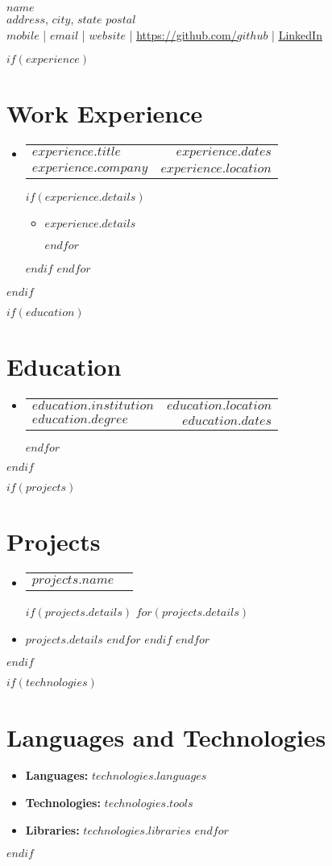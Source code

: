 \documentclass[letterpaper,10pt]{article}
\makeatletter
\newcommand{\resumeItem}[1]{
  \item\small{
    {#1 \vspace{-2pt}}
  }
}
\newcommand{\resumeSubheading}[4]{
  \vspace{-2pt}\item
    \begin{tabular*}{1.0\textwidth}[t]{l@{\extracolsep{\fill}}r}
      \textbf{#1} & \textbf{\small #2} \\
      \textit{\small#3} & \textit{\small #4} \\
    \end{tabular*}\vspace{-7pt}
}
\newcommand{\resumeProjectHeading}[1]{
    \item
    \begin{tabular*}{0.97\textwidth}{l@{\extracolsep{\fill}}r}
      \small#1  \\
    \end{tabular*}\vspace{-7pt}
}
\newcommand{\resumeSubHeadingListStart}{\begin{itemize}[leftmargin=0.0in, label={}]}
\newcommand{\resumeSubHeadingListEnd}{\end{itemize}}
\newcommand{\resumeItemListStart}{\begin{itemize}}
\newcommand{\resumeItemListEnd}{\end{itemize}\vspace{-5pt}}
\makeatother
\begin{document}
\begin{center}
    \textbf{\Huge \scshape $name$} \\ \vspace{1pt}
    $address$, $city$, $state$ $postal$ \\ \vspace{1pt}
    \small \raisebox{-0.1\height}$mobile$ | \href{mailto:$email$}{\underline{$email$}} |
    \href{https://$website$}{\underline{$website$}} |
    \href{https://github.com/$github$}{\underline{https://github.com/$github$}} |
    \href{https://linkedin.com/in/$linkedinID$}{\underline{LinkedIn}}
\end{center}

$if(experience)$
\section{Work Experience}
\resumeSubHeadingListStart
$for(experience)$
\resumeSubheading
  {$experience.title$}{$experience.dates$}
  {$experience.company$} {$experience.location$}
  $if(experience.details)$
  \resumeItemListStart 
    $for(experience.details)$
      \resumeItem{$experience.details$}
    $endfor$
  \resumeItemListEnd 
  $endif$
$endfor$
\resumeSubHeadingListEnd
$endif$

$if(education)$
\section{Education}
  \resumeSubHeadingListStart
  $for(education)$
    \resumeSubheading
    {$education.institution$}{$education.location$}
    {$education.degree$}{$education.dates$}
  $endfor$
  \resumeSubHeadingListEnd
$endif$

$if(projects)$
\section{Projects}
  \resumeSubHeadingListStart
  \vspace{-5pt}
  $for(projects)$
  \resumeProjectHeading
    {\textbf {$projects.name$}}
    $if(projects.details)$
    $for(projects.details)$
      \item\small{$projects.details$ \vspace{-2pt}}
    $endfor$
    $endif$
  $endfor$
  \vspace{-13pt}
  \resumeSubHeadingListEnd
$endif$


$if(technologies)$
\section{Languages and Technologies}
\resumeSubHeadingListStart
$for(technologies)$
\item\small{\textbf{Languages:} $technologies.languages$ \vspace{-2pt}}
\item\small{\textbf{Technologies:} $technologies.tools$}
\item\small{\textbf{Libraries:} $technologies.libraries$}
$endfor$
\resumeSubHeadingListEnd
$endif$
\end{document}
